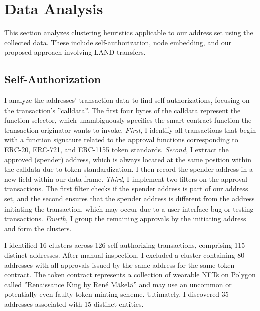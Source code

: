 \documentclass[12pt,a4paper,titlepage,oneside,english]{article}
\begin{document}

\section{Data Analysis}
This section analyzes clustering heuristics applicable to our address set using the collected data. These include self-authorization, node embedding, and our proposed approach involving LAND transfers.

\subsection{Self-Authorization}
I analyze the addresses' transaction data to find self-authorizations, focusing on the transaction's ''calldata''. The first four bytes of the calldata represent the function selector, which unambiguously specifies the smart contract function the transaction originator wants to invoke. \newline
\textit{First}, I identify all transactions that begin with a function signature related to the approval functions corresponding to ERC-20, ERC-721, and ERC-1155 token standards. \textit{Second}, I extract the approved (spender) address, which is always located at the same position within the calldata due to token standardization. I then record the spender address in a new field within our data frame. \textit{Third}, I implement two filters on the approval transactions. The first filter checks if the spender address is part of our address set, and the second ensures that the spender address is different from the address initiating the transaction, which may occur due to a user interface bug or testing transactions. \textit{Fourth}, I group the remaining approvals by the initiating address and form the clusters.

I identified 16 clusters across 126 self-authorizing transactions, comprising 115 distinct addresses. After manual inspection, I excluded a cluster containing 80 addresses with all approvals issued by the same address for the same token contract. The token contract represents a collection of wearable NFTs on Polygon called ''Renaissance King by René Mäkelä'' and may use an uncommon or potentially even faulty token minting scheme. Ultimately, I discovered 35 addresses associated with 15 distinct entities.
\end{document}
